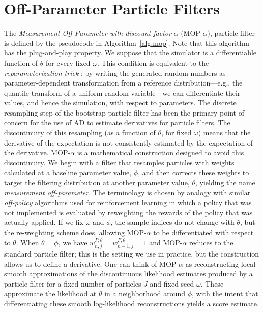 \documentclass[11pt]{article}
\begin{document}
\section{Off-Parameter Particle Filters}

The {\it Measurement Off-Parameter with discount factor} $\alpha$ (MOP-$\alpha$), particle filter is defined by the pseudocode in Algorithm~\ref{alg:mop}.
Note that this algorithm has the plug-and-play property.
We suppose that the simulator is a differentiable function of $\theta$ for every fixed $\omega$.
This condition is equivalent to the {\it reparameterization trick} \citep{corenflos21}; by writing the generated random numbers as parameter-dependent transformation from a reference distribution---e.g., the quantile transform of a uniform random variable---we can differentiate their values, and hence the simulation, with respect to parameters.
The discrete resampling step of the bootstrap particle filter has been the primary point of concern for the use of AD to estimate derivatives for particle filters.
The discontinuity of this resampling (as a function of $\theta$, for fixed $\omega$) means that the derivative of the expectation is not consistently estimated by the expectation of the derivative. 
MOP-$\alpha$ is a mathematical construction designed to avoid this discontinuity.
We begin with a filter that resamples particles with weights calculated at a baseline parameter value, $\phi$, and then corrects these weights to target the filtering distribution at another parameter value, $\theta$, yielding the name {\it measurement off-parameter}.
The terminology is chosen by analogy with similar {\it off-policy} algorithms used for reinforcement learning in which a policy that was not implemented is evaluated by reweighting the rewards of the policy that was actually applied.
If we fix $\omega$ and $\phi$, the sample indices do not change with $\theta$, but the re-weighting scheme does, allowing MOP-$\alpha$ to be differentiated with respect to $\theta$.
When $\theta = \phi$, we have $w_{n,j}^{P,\theta} = w_{n-1,j}^{F,\theta} = 1$ and MOP-$\alpha$ reduces  to the standard particle filter; this is the setting we use in practice,  but the construction allows us to define a derivative.
One can think of MOP-$\alpha$ as reconstructing local smooth approximations of the discontinuous likelihood estimates produced by a particle filter for a fixed number of particles $J$ and fixed seed $\omega$.
These approximate the likelihood at $\theta$ in a neighborhood around $\phi$, with the intent that differentiating these smooth log-likelihood reconstructions yields a score estimate.
\end{document}
